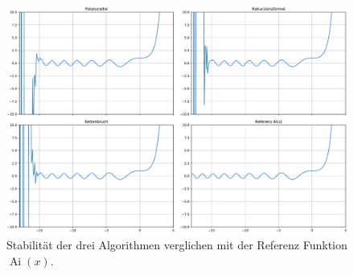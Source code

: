 \begin{figure}
    \centering
    \includegraphics[width=1\textwidth]{papers/0f1/images/stabilitaet.pdf}
    \caption{Stabilität der drei Algorithmen verglichen mit der Referenz Funktion $\operatorname{Ai}(x)$.
    \label{0f1:ausblick:plot:airy:stabilitaet}}
\end{figure}

